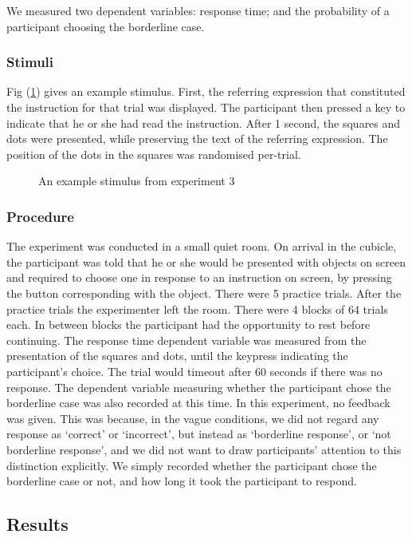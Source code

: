 \documentclass[man,floatmark]{apa}
\begin{document}
We measured two dependent variables: response time; and the probability of a participant choosing the borderline case.


\subsubsection{Stimuli}
Fig (\ref{stimuluse3}) gives an example stimulus. First, the referring expression that constituted the instruction for that trial was displayed. The participant then pressed a key to indicate that he or she had read the instruction. After 1 second,  the squares and dots were presented, while preserving the text of the referring expression. The position of the dots in the squares was randomised per-trial.

\begin{figure}[tbp]
\caption{An example stimulus from experiment 3}
\label{stimuluse3}
\end{figure}

\subsubsection{Procedure}
The experiment was conducted in a small quiet room.
On arrival in the cubicle, the participant was told that he or she would be presented with objects on screen and required to choose one in response to an instruction on screen, by pressing the button corresponding with the object. There were 5 practice trials. After the practice trials the experimenter left the room. There were 4 blocks of 64 trials each. In between blocks the participant had the opportunity to rest before continuing. The response time dependent variable was measured from the presentation of the squares and dots, until the keypress indicating the participant's choice. The trial would timeout after 60 seconds if there was no response. The dependent variable measuring whether the participant chose the borderline case was also recorded at this time. In this experiment, no feedback was given. This was because, in the vague conditions, we did not regard any response as `correct' or `incorrect', but instead as `borderline response', or `not borderline response', and we did not want to draw participants' attention to this distinction explicitly. We simply recorded whether the participant chose the borderline case or not, and how long it took the participant to respond.

\subsection{Results}
\end{document}
